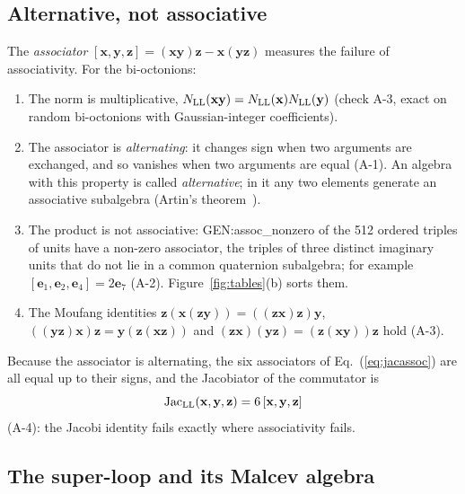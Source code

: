 \subsection{Alternative, not associative}

The \emph{associator} $[\mathbf x,\mathbf y,\mathbf z]=(\mathbf x\mathbf y)\mathbf z-\mathbf x(\mathbf
y\mathbf z)$ measures the failure of associativity. For the bi-octonions:
\begin{enumerate}
\item The norm is multiplicative, $N_{\rm LL}(\mathbf x\mathbf y)=N_{\rm LL}(\mathbf x)N_{\rm LL}(\mathbf
y)$ (check A-3, exact on random bi-octonions with Gaussian-integer coefficients).
\item The associator is \emph{alternating}: it changes sign when two arguments are exchanged, and so
vanishes when two arguments are equal (A-1). An algebra with this property is called
\emph{alternative}; in it any two elements generate an associative subalgebra (Artin's
theorem~\cite{Schafer1966}).
\item The product is not associative: {{GEN:assoc_nonzero}} of the 512 ordered triples of units have
a non-zero associator, the triples of three distinct imaginary units that do not lie in a common
quaternion subalgebra; for example $[\mathbf e_1,\mathbf e_2,\mathbf e_4]=2\mathbf e_7$ (A-2).
Figure~\ref{fig:tables}(b) sorts them.
\item The Moufang identities
$\mathbf z(\mathbf x(\mathbf z\mathbf y))=((\mathbf z\mathbf x)\mathbf z)\mathbf y$,
$((\mathbf y\mathbf z)\mathbf x)\mathbf z=\mathbf y(\mathbf z(\mathbf x\mathbf z))$ and
$(\mathbf z\mathbf x)(\mathbf y\mathbf z)=(\mathbf z(\mathbf x\mathbf y))\mathbf z$ hold (A-3).
\end{enumerate}
Because the associator is alternating, the six associators of Eq.~(\ref{eq:jacassoc}) are all equal
up to their signs, and the Jacobiator of the commutator is
\begin{equation}
\mathrm{Jac}_{\rm LL}(\mathbf x,\mathbf y,\mathbf z)=6\,[\mathbf x,\mathbf y,\mathbf z]
\label{eq:jac6}
\end{equation}
(A-4): the Jacobi identity fails exactly where associativity fails.

\subsection{The super-loop and its Malcev algebra}

